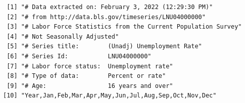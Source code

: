 \begin{frame}[fragile]

\vspace{-3mm}

\begin{knitrout}\small
{}\color{fgcolor}\begin{kframe}
\begin{alltt}
\hlstd{(}\hlstd{,}\hlstd{=}\hlstd{)}
\end{alltt}
\end{kframe}
\end{knitrout}

\vspace{-3mm}

\begin{knitrout}\small
{}\color{fgcolor}\begin{kframe}
\begin{verbatim}
 [1] "# Data extracted on: February 3, 2022 (12:29:30 PM)"        
 [2] "# from http://data.bls.gov/timeseries/LNU04000000"          
 [3] "# Labor Force Statistics from the Current Population Survey"
 [4] "# Not Seasonally Adjusted"                                  
 [5] "# Series title:        (Unadj) Unemployment Rate"           
 [6] "# Series Id:           LNU04000000"                         
 [7] "# Labor force status:  Unemployment rate"                   
 [8] "# Type of data:        Percent or rate"                     
 [9] "# Age:                 16 years and over"                   
[10] "Year,Jan,Feb,Mar,Apr,May,Jun,Jul,Aug,Sep,Oct,Nov,Dec"       
\end{verbatim}
\end{kframe}
\end{knitrout}

\vspace{-3mm}

\begin{knitrout}\small
{}\color{fgcolor}\begin{kframe}
\begin{alltt}
 \hlkwb{<-} \hlstd{(}\hlstd{=}\hlstd{,}
  \hlstd{=}\hlstd{,}\hlstd{=}\hlstd{)}
\hlstd{)}
\end{alltt}
\end{kframe}
\end{knitrout}


\end{frame}
